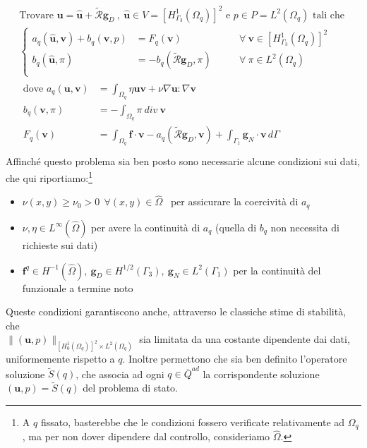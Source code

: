 \documentclass[a4paper,11pt,twoside]{article}
\renewcommand{\u}{\mathbf{u}}
\newcommand{\Oq}{{\Omega_q}}
\theoremstyle{plain}
\theoremstyle{definition}
\theoremstyle{remark}
\begin{document}
\begin{equation}
\begin{split}
	\text{Trovare }\mathbf{u} = \mathbf{\hat{u}}+\widetilde{\mathcal{R}}\mathbf{g}_D \ ,\ \mathbf{\hat{u}}\in V=[H^1_{\Gamma_3}(\Omega_q)]^2 \text{ e } p\in P=L^2(\Omega_q)\text{ tali che } \\
	\left\{
	\begin{aligned}
		a_q(\mathbf{\hat{u}},\mathbf{v}) + b_q(\mathbf{v},p) &= F_q(\mathbf{v})\qquad&\forall\ \mathbf{v}\in  [H^1_{\Gamma_3}(\Omega_q)]^2\\
		b_q(\mathbf{\hat{u}},\pi) &= -b_q(\widetilde{\mathcal{R}}\mathbf g_D,\pi)
				\qquad&\forall\ \pi \in L^2(\Omega_q)\\
	\end{aligned}\right.\\
	\begin{split}
	\text{dove } a_q(\mathbf{u},\mathbf{v}) &=\int_{\Omega_q}{\eta \mathbf{u}\mathbf{v}+\nu\nabla \mathbf{u}:\nabla\mathbf{v}}\\
		b_q(\mathbf{v},\pi) &= -\int_{\Omega_q}{\pi\ div\ \mathbf{v}}\\
		F_q(\mathbf{v}) &= \int_{\Omega_q}{ \mathbf{f}\cdot \mathbf{v}}-a_q(\widetilde{\mathcal{R}}\mathbf{g}_D,\mathbf{v}) + \int_{\Gamma_1}{\mathbf{g}_N\cdot\mathbf{v}\,d\Gamma}\\
	\end{split}
\end{split}
\label{eq:Stokesdeb}
\end{equation}
Affinch\'e questo problema sia ben posto sono necessarie alcune condizioni sui dati, che qui riportiamo:\footnote{A $q$ fissato, basterebbe che le condizioni fossero verificate relativamente ad $\Omega_q$, ma per non dover dipendere dal controllo, consideriamo $\hat{\Omega}$.}
\begin{itemize}
	\item $\nu(x,y)\geq\nu_0>0\ \ \forall (x,y)\in\hat{\Omega}$ \ per assicurare la coercivit\`a di $a_q$
	\item $\nu,\eta\in L^\infty(\hat{\Omega})$ per avere la continuit\`a di $a_q$ (quella di $b_q$ non necessita di richieste sui dati)
	\item $\mathbf{f}^q\in H^{-1}(\hat{\Omega}),\ \mathbf g_D\in H^{1/2}(\Gamma_3),\ \mathbf g_N\in L^2(\Gamma_1)$ per la continuità del funzionale a termine noto
\end{itemize}
Queste condizioni garantiscono anche, attraverso le classiche stime di stabilità, che\\$\|(\u,p)\|_{[H^1_0(\Oq)]^2\times L^2(\Oq)}$ sia limitata da una costante dipendente dai dati, uniformemente rispetto a $q$. Inoltre permettono che sia ben definito l'operatore soluzione $\widetilde{S}(q)$, che associa ad ogni $q\in\overline{Q}^{ad}$ la corrispondente soluzione $(\mathbf{u},p)=\widetilde{S}(q)$ del problema di stato.
\end{document}
